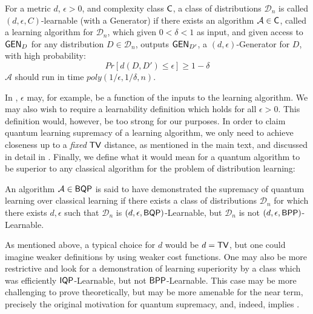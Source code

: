 \begin{definition}
    \label{def:weak_learnable_supp}
    For a metric $d$, $\epsilon > 0$, and complexity class $\operatorname{\textsf{C}}$, a class of distributions $\mathcal{D}_n$ is called $\left( d , \epsilon, C \right)$-learnable (with a Generator) if there exists an algorithm $\mathcal{A} \in \operatorname{\textsf{C}}$, called a learning algorithm for $\mathcal{D}_n$, which given $0 < \delta < 1$ as input, and given access to $\operatorname{\textsf{GEN}}_{D}$ for any distribution $D \in \mathcal{D}_n$, outputs $\operatorname{\textsf{GEN}}_{D'}$, a $\left( d , \epsilon \right)$-Generator for $D$, with high probability:
    \begin{equation}
        Pr \left[ d \left( D, D' \right) \leq \epsilon \right] \geq 1 - \delta
    \end{equation}
    $\mathcal{A}$ should run in time $poly(1/\epsilon, 1/\delta, n)$.
\end{definition}

In , $\epsilon$ may, for example, be a function of the inputs to the learning algorithm. We may also wish to require a learnability definition which holds for all $\epsilon > 0$. This definition would, however, be too strong for our purposes. In order to claim quantum learning supremacy of a learning algorithm, we only need to achieve closeness up to a \textit{fixed} $\operatorname{\textsf{TV}}$ distance, as mentioned in the main text, and discussed in detail in . Finally, we define what it would mean for a quantum algorithm to be superior to any classical algorithm for the problem of distribution learning:

\begin{definition}    
    \label{defn:superiority_supp}
    An algorithm $\mathcal{A} \in \textsf{BQP}$ is said to have demonstrated the supremacy of quantum learning over classical learning if there exists a class of distributions $\mathcal{D}_n$ for which there exists $d ,\epsilon$ such that $\mathcal{D}_n$ is $\left( d ,\epsilon, \textsf{BQP} \right)$-Learnable, but $\mathcal{D}_n$ is not $\left( d ,\epsilon, \textsf{BPP} \right)$-Learnable.
\end{definition}

As mentioned above, a typical choice for $d$ would be $d = \operatorname{\textsf{TV}}$, but one could imagine weaker definitions by using weaker cost functions. One may also be more restrictive and look for a demonstration of learning superiority by a class which was efficiently $\operatorname{\textsf{IQP}}$-Learnable, but not $\textsf{BPP}$-Learnable. This case may be more challenging to prove theoretically, but may be more amenable for the near term, precisely the original motivation for quantum supremacy, and, indeed, implies .